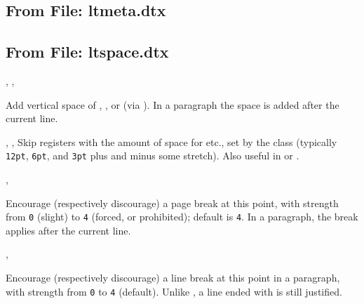\documentclass{l3in2edoc}
\begin{document}
\leavevmode


\subsection{From File: ltmeta.dtx}

\leavevmode


\subsection{From File: ltspace.dtx}



\begin{function}[user]
  {
    \bigskip,
    \medskip,
    \smallskip
  }
  \begin{syntax}
  \end{syntax}
  Add vertical space of , , or
   (via ). In a paragraph the space is
  added after the current line.
\end{function}



\begin{variable}[user]
  {
    \bigskipamount,
    \medskipamount,
    \smallskipamount
  }
  Skip registers with the amount of space for  etc.,
  set by the class (typically \texttt{12pt}, \texttt{6pt}, and
  \texttt{3pt} plus and minus some stretch). Also useful in
   or .
\end{variable}



\begin{function}[user]
  {
    \pagebreak,
    \nopagebreak
  }
  \begin{syntax}
     
  \end{syntax}
  Encourage (respectively discourage) a page break at this point,
  with strength  from \texttt{0} (slight) to \texttt{4}
  (forced, or prohibited); default is \texttt{4}. In a paragraph, the
  break applies after the current line.
\end{function}


\begin{function}[user]
  {
    \linebreak,
    \nolinebreak
  }
  \begin{syntax}
     
  \end{syntax}
  Encourage (respectively discourage) a line break at this point in a
  paragraph, with strength  from \texttt{0} to
  \texttt{4} (default). Unlike , a line ended with
   is still justified.
\end{function}
\end{document}
